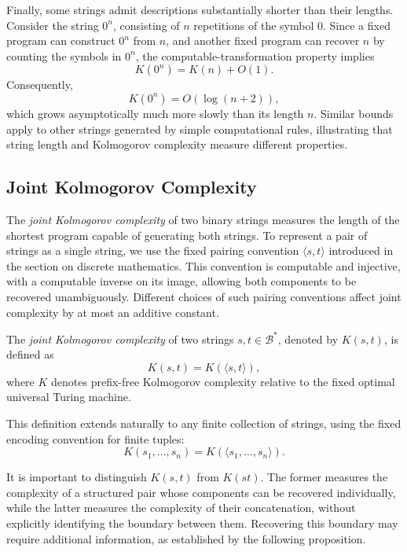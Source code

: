 Finally, some strings admit descriptions substantially shorter than their lengths. Consider the string $0^n$, consisting of $n$ repetitions of the symbol $0$. Since a fixed program can construct $0^n$ from $n$, and another fixed program can recover $n$ by counting the symbols in $0^n$, the computable-transformation property implies
\[
K(0^n)=K(n)+O(1).
\]
Consequently,
\[
K(0^n)=O(\log(n+2)),
\]
which grows asymptotically much more slowly than its length $n$. Similar bounds apply to other strings generated by simple computational rules, illustrating that string length and Kolmogorov complexity measure different properties.


\subsection*{Joint Kolmogorov Complexity}
\label{sec:joint_kolmogorov_complexity}

The \emph{joint Kolmogorov complexity} of two binary strings measures the length of the shortest program capable of generating both strings. To represent a pair of strings as a single string, we use the fixed pairing convention $\langle s,t\rangle$ introduced in the section on discrete mathematics. This convention is computable and injective, with a computable inverse on its image, allowing both components to be recovered unambiguously. Different choices of such pairing conventions affect joint complexity by at most an additive constant.

\begin{definition}
\label{def:Joint-Kolmogorov-Complexity}
The \emph{joint Kolmogorov complexity} of two strings $s,t\in\mathcal{B}^*$, denoted by $K(s,t)$, is defined as
\[
K(s,t)=K(\langle s,t\rangle),
\]
where $K$ denotes prefix-free Kolmogorov complexity relative to the fixed optimal universal Turing machine.
\end{definition}

This definition extends naturally to any finite collection of strings, using the fixed encoding convention for finite tuples:
\[
K(s_1,\ldots,s_n)
=K(\langle s_1,\ldots,s_n\rangle).
\]

It is important to distinguish $K(s,t)$ from $K(st)$. The former measures the complexity of a structured pair whose components can be recovered individually, while the latter measures the complexity of their concatenation, without explicitly identifying the boundary between them. Recovering this boundary may require additional information, as established by the following proposition.

